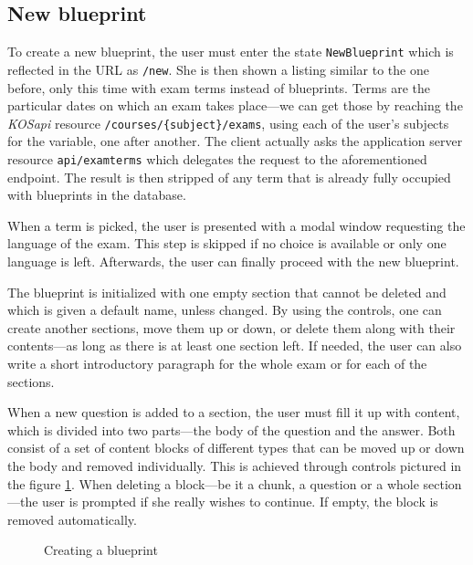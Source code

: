 \documentclass[thesis=M,english,hidelinks]{FITthesis}[2012/10/20]
\newcommand{\code}{\texttt}
\begin{document}
    \subsection{New blueprint}

To create a new blueprint, the user must enter the state \code{NewBlueprint} which is reflected in the URL as \code{/new}. She is then shown a listing similar to the one before, only this time with exam terms instead of blueprints. Terms are the particular dates on which an exam takes place---we can get those by reaching the \textit{KOSapi} resource \code{/courses/\{subject\}/exams}, using each of the user's subjects for the variable, one after another. The client actually asks the application server resource \code{api/examterms} which delegates the request to the aforementioned endpoint. The result is then stripped of any term that is already fully occupied with blueprints in the database.

When a term is picked, the user is presented with a modal window requesting the language of the exam. This step is skipped if no choice is available or only one language is left. Afterwards, the user can finally proceed with the new blueprint.

The blueprint is initialized with one empty section that cannot be deleted and which is given a default name, unless changed. By using the controls, one can create another sections, move them up or down, or delete them along with their contents---as long as there is at least one section left. If needed, the user can also write a short introductory paragraph for the whole exam or for each of the sections.

When a new question is added to a section, the user must fill it up with content, which is divided into two parts---the body of the question and the answer. Both consist of a set of content blocks of different types that can be moved up or down the body and removed individually. This is achieved through controls pictured in the figure \ref{fig:new_blueprint}. When deleting a block---be it a chunk, a question or a whole section---the user is prompted if she really wishes to continue. If empty, the block is removed automatically.

\begin{figure}
  \setlength\fboxsep{0pt}
  \setlength\fboxrule{0.2pt}
  \caption{Creating a blueprint}
  \label{fig:new_blueprint}
\end{figure}
\end{document}
